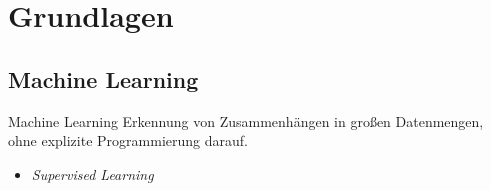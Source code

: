 \section[\thesection \  Grundlagen]{Grundlagen}\label{sec:grundlagen}



\subsection[\thesection .\thesubsection \ 
Machine Learning]{Machine Learning}\label{subsec:ml}


\begin{frame}{Machine Learning}
        Erkennung von Zusammenhängen in großen Datenmengen,\\ohne explizite Programmierung darauf.
        \begin{itemize}
            \item \textit{Supervised Learning}
        \end{itemize}

        \begin{figure}[h]
            \centering
            \def\svgwidth{0.8\columnwidth}
            
        \end{figure}

\end{frame}

